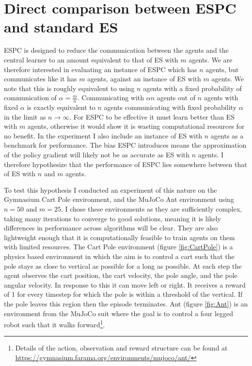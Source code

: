 \section{Direct comparison between ESPC and standard ES}
ESPC is designed to reduce the communication between the agents and the central learner to an amount equivalent to that of ES with $m$ agents. 
We are therefore interested in evaluating an instance of ESPC which has $n$ agents, but communicates like it has $m$ agents, against an instance of ES with $m$ agents. We note that this is roughly equivalent to using $n$ agents with a fixed probability of communication of $\alpha=\frac{m}{n}$. Communicating with $\alpha n$ agents out of $n$ agents with fixed $\alpha$ is exactly equivalent to $n$ agents communicating with fixed probability $\alpha$ in the limit as $n \to \infty$.
For ESPC to be effective it must learn better than ES with $m$ agents, otherwise it would show it is wasting computational resources for no benefit. 
In the experiment I also include an instance of ES with $n$ agents as a benchmark for performance. 
The bias ESPC introduces means the approximation of the policy gradient will likely not be as accurate as ES with $n$ agents.
I therefore hypothesize that the performance of ESPC lies somewhere between that of ES with $n$ and $m$ agents.

To test this hypothesis I conducted an experiment of this nature on the Gymnasium Cart Pole environment, and the MuJoCo Ant environment 
using $n=50$ and $m=25$. I chose these environments as they are sufficiently complex, taking many iterations to converge to good solutions, meaning it is likely differences in performance across algorithms will be clear. They are also lightweight enough that it is computationally feasible to train agents on them with limited resources.
The Cart Pole environment (figure \ref{fig:CartPole}) is a physics based environment in which the aim is to control a cart such that the pole stays as close to vertical as possible for a long as possible. 
At each step the agent observes the cart position, the cart velocity, the pole angle, and the pole angular velocity. In response to this it can move left or right. 
It receives a reward of 1 for every timestep for which the pole is within a threshold of the vertical. If the pole leaves this region then the episode terminates. Ant (figure \ref{fig:Ant}) is an environment from the MuJoCo suit where the goal is to control a four legged robot such that it walks forward\footnote{Details of the action, observation and reward structure can be found at \url{https://gymnasium.farama.org/environments/mujoco/ant/}}. 


